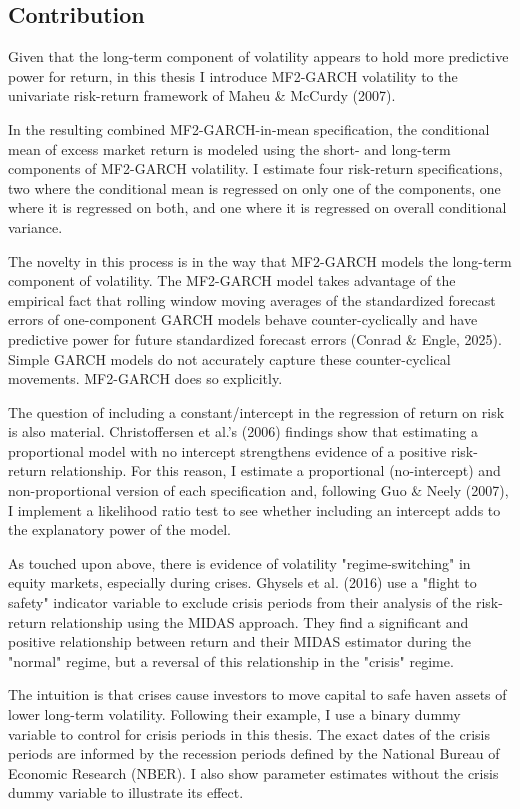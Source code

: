 \documentclass[12pt]{article}
\begin{document}
\subsection{Contribution}
Given that the long-term component of volatility appears to hold more predictive power for return, in this thesis I introduce MF2-GARCH volatility to the univariate risk-return framework of  Maheu \& McCurdy (2007).\par
In the resulting combined MF2-GARCH-in-mean specification, the conditional mean of excess market return is modeled using the short- and long-term components of MF2-GARCH volatility. I estimate four risk-return specifications, two where the conditional mean is regressed on only one of the components, one where it is regressed on both, and one where it is regressed on overall conditional variance.\par
The novelty in this process is in the way that MF2-GARCH models the long-term component of volatility. The MF2-GARCH model takes advantage of the empirical fact that rolling window moving averages of the standardized forecast errors of one-component GARCH models behave counter-cyclically and have predictive power for future standardized forecast errors (Conrad \& Engle, 2025). Simple GARCH models do not accurately capture these counter-cyclical movements. MF2-GARCH does so explicitly.\par
The question of including a constant/intercept in the regression of return on risk is also material. Christoffersen et al.'s (2006) findings show that estimating a proportional model with no intercept strengthens evidence of a positive risk-return relationship. For this reason, I estimate a proportional (no-intercept) and non-proportional version of each specification and, following Guo \& Neely (2007), I implement a likelihood ratio test to see whether including an intercept adds to the explanatory power of the model.\par
As touched upon above, there is evidence of volatility "regime-switching" in equity markets, especially during crises. Ghysels et al. (2016) use a "flight to safety" indicator variable to exclude crisis periods from their analysis of the risk-return relationship using the MIDAS approach. They find a significant and positive relationship between return and their MIDAS estimator during the "normal" regime, but a reversal of this relationship in the "crisis" regime.\par
The intuition is that crises cause investors to move capital to safe haven assets of lower long-term volatility. Following their example, I use a binary dummy variable to control for crisis periods in this thesis. The exact dates of the crisis periods are informed by the recession periods defined by the National Bureau of Economic Research (NBER). I also show parameter estimates without the crisis dummy variable to illustrate its effect.\par
\end{document}

